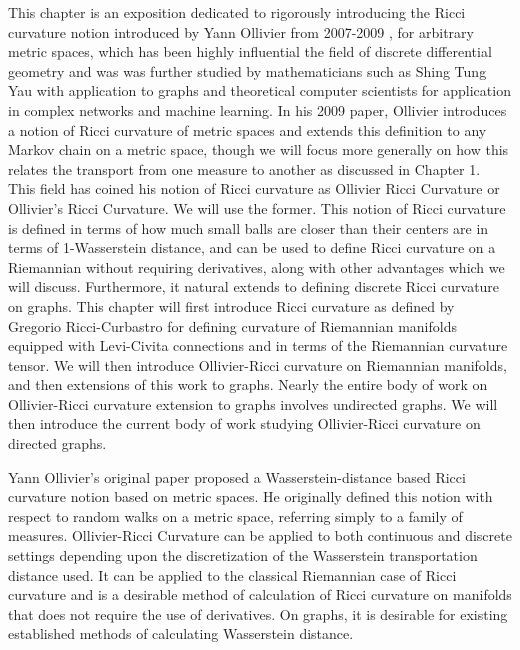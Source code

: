 \documentclass{Dissertate}
\theoremstyle{definition}
\theoremstyle{definition} %
\theoremstyle{definition}
\begin{document}
This chapter is an exposition dedicated to rigorously introducing the Ricci curvature notion introduced by Yann Ollivier from 2007-2009 \cite{ollivier_ricci_2007},  \cite{ollivier_ricci_2009} for arbitrary metric spaces, which has been highly influential the field of discrete differential geometry and was was further studied by mathematicians such as Shing Tung Yau with application to graphs and theoretical computer scientists for application in complex networks and machine learning. In his 2009 paper, Ollivier introduces a notion of Ricci curvature of metric spaces and extends this definition to any Markov chain on a metric space, though we will focus more generally on how this relates the transport from one measure to another as discussed in Chapter 1. This field has coined his notion of Ricci curvature as Ollivier Ricci Curvature or Ollivier's Ricci Curvature. We will use the former. This notion of Ricci curvature is defined in terms of how much small balls are closer than their centers are in terms of 1-Wasserstein distance, and can be used to define Ricci curvature on a Riemannian without requiring derivatives, along with other advantages which we will discuss. Furthermore, it natural extends to defining discrete Ricci curvature on graphs. This chapter will first introduce Ricci curvature as defined by Gregorio Ricci-Curbastro for defining curvature of Riemannian manifolds equipped with Levi-Civita connections and in terms of the Riemannian curvature tensor. We will then introduce Ollivier-Ricci curvature on Riemannian manifolds, and then extensions of this work to graphs. Nearly the entire body of work on Ollivier-Ricci curvature extension to graphs involves undirected graphs. We will then introduce the current body of work studying Ollivier-Ricci curvature on directed graphs. 

Yann Ollivier's original paper proposed a Wasserstein-distance based Ricci curvature notion based on metric spaces. He originally defined this notion with respect to random walks on a metric space, referring simply to a family of measures. Ollivier-Ricci Curvature can be applied to both continuous and discrete settings depending upon the discretization of the Wasserstein transportation distance used. It can be applied to the classical Riemannian case of Ricci curvature and is a desirable method of calculation of Ricci curvature on manifolds that does not require the use of derivatives. On graphs, it is desirable for existing established methods of calculating Wasserstein distance. 
\end{document}
